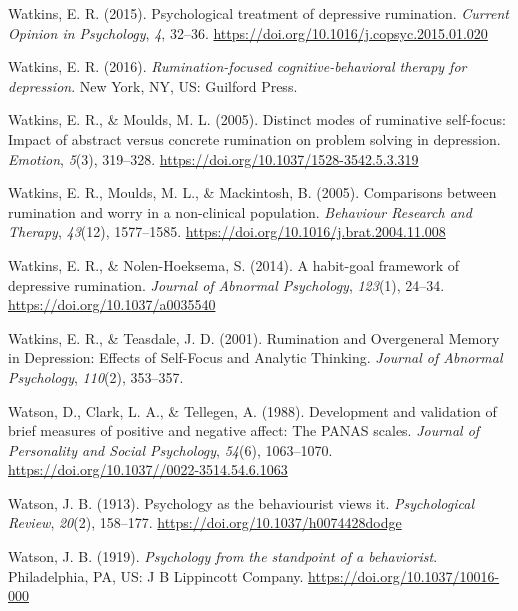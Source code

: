 \documentclass[a4paper,12pt,twoside,onecolumn,openright,final,oldfontcommands]{memoir}
\begin{document}
\leavevmode\hypertarget{ref-watkins_psychological_2015}{}%
Watkins, E. R. (2015). Psychological treatment of depressive rumination. \emph{Current Opinion in Psychology}, \emph{4}, 32--36. \url{https://doi.org/10.1016/j.copsyc.2015.01.020}

\leavevmode\hypertarget{ref-watkins_rumination-focused_2016}{}%
Watkins, E. R. (2016). \emph{Rumination-focused cognitive-behavioral therapy for depression}. New York, NY, US: Guilford Press.

\leavevmode\hypertarget{ref-watkins_distinct_2005}{}%
Watkins, E. R., \& Moulds, M. L. (2005). Distinct modes of ruminative self-focus: Impact of abstract versus concrete rumination on problem solving in depression. \emph{Emotion}, \emph{5}(3), 319--328. \url{https://doi.org/10.1037/1528-3542.5.3.319}

\leavevmode\hypertarget{ref-watkins_comparisons_2005}{}%
Watkins, E. R., Moulds, M. L., \& Mackintosh, B. (2005). Comparisons between rumination and worry in a non-clinical population. \emph{Behaviour Research and Therapy}, \emph{43}(12), 1577--1585. \url{https://doi.org/10.1016/j.brat.2004.11.008}

\leavevmode\hypertarget{ref-watkins_habit-goal_2014}{}%
Watkins, E. R., \& Nolen-Hoeksema, S. (2014). A habit-goal framework of depressive rumination. \emph{Journal of Abnormal Psychology}, \emph{123}(1), 24--34. \url{https://doi.org/10.1037/a0035540}

\leavevmode\hypertarget{ref-watkins_rumination_2001}{}%
Watkins, E. R., \& Teasdale, J. D. (2001). Rumination and Overgeneral Memory in Depression: Effects of Self-Focus and Analytic Thinking. \emph{Journal of Abnormal Psychology}, \emph{110}(2), 353--357.

\leavevmode\hypertarget{ref-watson_development_1988}{}%
Watson, D., Clark, L. A., \& Tellegen, A. (1988). Development and validation of brief measures of positive and negative affect: The PANAS scales. \emph{Journal of Personality and Social Psychology}, \emph{54}(6), 1063--1070. \url{https://doi.org/10.1037//0022-3514.54.6.1063}

\leavevmode\hypertarget{ref-watson_psychology_1913}{}%
Watson, J. B. (1913). Psychology as the behaviourist views it. \emph{Psychological Review}, \emph{20}(2), 158--177. \url{https://doi.org/10.1037/h0074428dodge}

\leavevmode\hypertarget{ref-watson_psychology_1919}{}%
Watson, J. B. (1919). \emph{Psychology from the standpoint of a behaviorist}. Philadelphia, PA, US: J B Lippincott Company. \url{https://doi.org/10.1037/10016-000}
\end{document}
